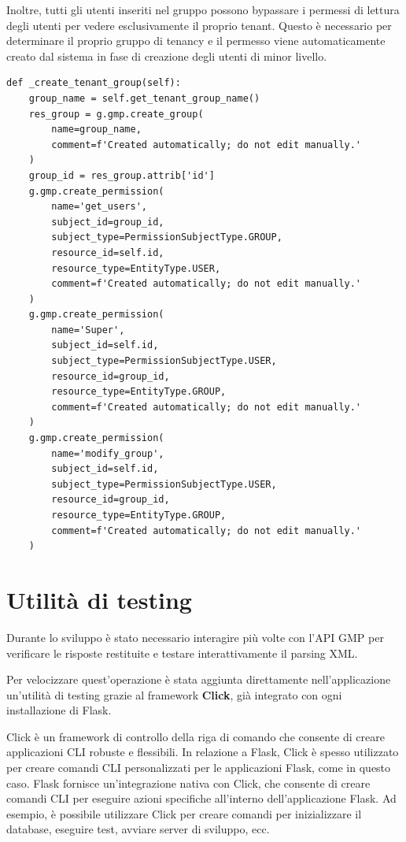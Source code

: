 Inoltre, tutti gli utenti inseriti nel gruppo possono bypassare i permessi di lettura degli utenti per vedere esclusivamente il proprio tenant. Questo è necessario per determinare il proprio gruppo di tenancy e il permesso viene automaticamente creato dal sistema in fase di creazione degli utenti di minor livello.

\begin{lstlisting}[caption={Creazione del gruppo di tenancy e dei rispettivi permessi}]
def _create_tenant_group(self):
    group_name = self.get_tenant_group_name()
    res_group = g.gmp.create_group(
        name=group_name,
        comment=f'Created automatically; do not edit manually.'
    )
    group_id = res_group.attrib['id']
    g.gmp.create_permission(
        name='get_users',
        subject_id=group_id,
        subject_type=PermissionSubjectType.GROUP,
        resource_id=self.id,
        resource_type=EntityType.USER,
        comment=f'Created automatically; do not edit manually.'
    )
    g.gmp.create_permission(
        name='Super',
        subject_id=self.id,
        subject_type=PermissionSubjectType.USER,
        resource_id=group_id,
        resource_type=EntityType.GROUP,
        comment=f'Created automatically; do not edit manually.'
    )
    g.gmp.create_permission(
        name='modify_group',
        subject_id=self.id,
        subject_type=PermissionSubjectType.USER,
        resource_id=group_id,
        resource_type=EntityType.GROUP,
        comment=f'Created automatically; do not edit manually.'
    )
\end{lstlisting}

\section{Utilità di testing}
Durante lo sviluppo è stato necessario interagire più volte con l'API GMP per verificare le risposte restituite e testare interattivamente il parsing XML.

Per velocizzare quest'operazione è stata aggiunta direttamente nell'applicazione  un'utilità di testing grazie al framework \textbf{Click}, già integrato con ogni installazione di Flask.

Click è un framework di controllo della riga di comando che consente di creare applicazioni CLI robuste e flessibili. In relazione a Flask, Click è spesso utilizzato per creare comandi CLI personalizzati per le applicazioni Flask, come in questo caso.
Flask fornisce un'integrazione nativa con Click, che consente di creare comandi CLI per eseguire azioni specifiche all'interno dell'applicazione Flask. Ad esempio, è possibile utilizzare Click per creare comandi per inizializzare il database, eseguire test, avviare server di sviluppo, ecc.


